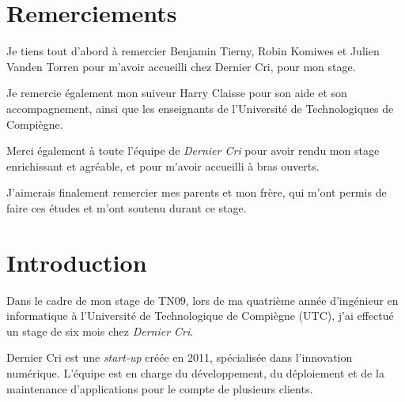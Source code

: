 \section{Remerciements}\label{remerciements}

\bigskip

Je tiens tout d'abord à remercier Benjamin Tierny, Robin Komiwes et
Julien Vanden Torren pour m'avoir accueilli chez Dernier Cri, pour mon
stage.

\bigskip

Je remercie également mon suiveur Harry Claisse pour son aide et son
accompagnement, ainsi que les enseignants de l'Université de
Technologiques de Compiègne.

\bigskip

Merci également à toute l'équipe de \emph{Dernier Cri} pour avoir rendu
mon stage enrichissant et agréable, et pour m'avoir accueilli à bras
ouverts.

\bigskip

J'aimerais finalement remercier mes parents et mon frère, qui m'ont
permis de faire ces études et m'ont soutenu durant ce stage.

\newpage

\section{Introduction}\label{introduction}

\bigskip

Dans le cadre de mon stage de TN09, lors de ma quatrième année
d'ingénieur en informatique à l'Université de Technologique de Compiègne
(UTC), j'ai effectué un stage de six mois chez \emph{Dernier Cri}.

\bigskip

Dernier Cri est une \emph{start-up} créée en 2011, spécialisée dans
l'innovation numérique. L'équipe est en charge du développement, du
déploiement et de la maintenance d'applications pour le compte de
plusieurs clients.

